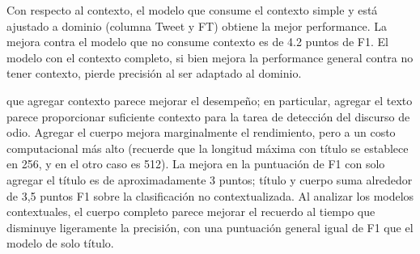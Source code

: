 Con respecto al contexto, el modelo que consume el contexto simple y está ajustado a dominio (columna Tweet y FT) obtiene la mejor performance. La mejora contra el modelo que no consume contexto es de 4.2 puntos de F1. El modelo con el contexto completo, si bien mejora la performance general contra no tener contexto, pierde precisión al ser adaptado al dominio.

que agregar contexto parece mejorar el desempeño; en particular, agregar el texto parece proporcionar suficiente contexto para la tarea de detección del discurso de odio. Agregar el cuerpo mejora marginalmente el rendimiento, pero a un costo computacional más alto (recuerde que la longitud máxima con título se establece en 256, y en el otro caso es 512). La mejora en la puntuación de F1 con solo agregar el título es de aproximadamente 3 puntos; título y cuerpo suma alrededor de 3,5 puntos F1 sobre la clasificación no contextualizada. Al analizar los modelos contextuales, el cuerpo completo parece mejorar el recuerdo al tiempo que disminuye ligeramente la precisión, con una puntuación general igual de F1 que el modelo de solo título.

